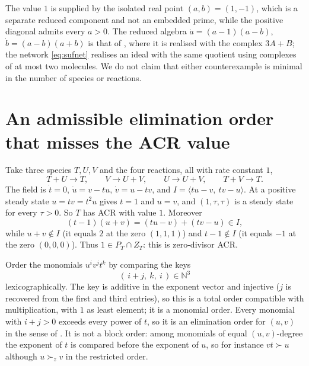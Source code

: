 \documentclass[11pt,a4paper]{article}
\theoremstyle{plain}
\theoremstyle{definition}
\theoremstyle{remark}
\newcommand{\N}{\mathbb{N}}
\begin{document}
The value $1$ is supplied by the isolated real point $(a,b)=(1,-1)$, which is a separate reduced component and not an embedded prime, while the positive diagonal admits every $a>0$. The reduced algebra $\dot a=(a-1)(a-b)$, $\dot b=(a-b)(a+b)$ is that of \cite[Example 3.12]{acr}, where it is realised with the complex $3A+B$; the network \eqref{eq:sufnet} realises an ideal with the same quotient using complexes of at most two molecules. We do not claim that either counterexample is minimal in the number of species or reactions.

\section{An admissible elimination order that misses the ACR value}\label{sec:order}

Take three species $T,U,V$ and the four reactions, all with rate constant $1$,
\begin{equation}\label{eq:ordernet}
T+U\to T,\qquad V\to U+V,\qquad U\to U+V,\qquad T+V\to T .
\end{equation}
The field is $\dot t=0$, $\dot u=v-tu$, $\dot v=u-tv$, and $I=\langle tu-v,\ tv-u\rangle$. At a positive steady state $u=tv=t^2u$ gives $t=1$ and $u=v$, and $(1,\tau,\tau)$ is a steady state for every $\tau>0$. So $T$ has ACR with value $1$. Moreover
\[
  (t-1)(u+v)=(tu-v)+(tv-u)\in I ,
\]
while $u+v\notin I$ (it equals $2$ at the zero $(1,1,1)$) and $t-1\notin I$ (it equals $-1$ at the zero $(0,0,0)$). Thus $1\in P_T\cap Z_T$: this is zero-divisor ACR.

Order the monomials $u^iv^jt^k$ by comparing the keys
\begin{equation}\label{eq:key}
  (\,i+j,\ k,\ i\,)\in\N^3
\end{equation}
lexicographically. The key is additive in the exponent vector and injective ($j$ is recovered from the first and third entries), so this is a total order compatible with multiplication, with $1$ as least element; it is a monomial order. Every monomial with $i+j>0$ exceeds every power of $t$, so it is an elimination order for $(u,v)$ in the sense of \cite{acr}. It is not a block order: among monomials of equal $(u,v)$-degree the exponent of $t$ is compared before the exponent of $u$, so for instance $vt\succ u$ although $u\succ_z v$ in the restricted order.
\end{document}
